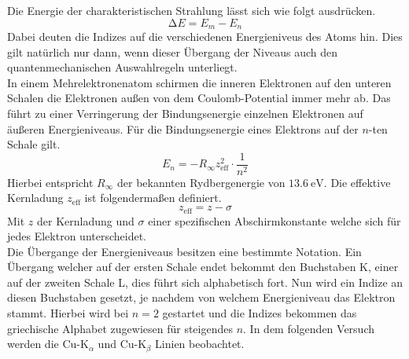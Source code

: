 Die Energie der charakteristischen Strahlung lässt sich wie folgt ausdrücken.
\begin{equation}
\increment E = E_{m} - E_{n}
\end{equation}
Dabei deuten die Indizes auf die verschiedenen Energieniveus des Atoms hin. Dies gilt natürlich nur dann, wenn dieser Übergang der Niveaus auch den quantenmechanischen Auswahlregeln unterliegt.
\\
In einem Mehrelektronenatom schirmen die inneren Elektronen auf den unteren Schalen die Elektronen außen von dem Coulomb-Potential immer mehr ab. Das führt zu einer Verringerung der Bindungsenergie einzelnen Elektronen
auf äußeren Energieniveaus. Für die Bindungsenergie eines Elektrons auf der $n$-ten Schale gilt.
\begin{equation}
E_{n} = -R_{\infty} z_{\text{eff}}^{2} \cdot \frac{1}{n^{2}}
\end{equation}
Hierbei entspricht $R_{\infty}$ der bekannten Rydbergenergie von $\SI{13.6}{\electronvolt}$. Die effektive Kernladung $ z_{\text{eff}}$ ist folgendermaßen definiert.
\begin{equation*}
 z_{\text{eff}} = z - \sigma
\end{equation*}
Mit $z$ der Kernladung und $\sigma$ einer spezifischen Abschirmkonstante welche sich für jedes Elektron unterscheidet.
\\
Die Übergange der Energieniveaus besitzen eine bestimmte Notation. Ein Übergang welcher auf der ersten Schale endet bekommt den Buchstaben K, einer auf der zweiten Schale L, dies führt sich
alphabetisch fort. Nun wird ein Indize an diesen Buchstaben gesetzt, je nachdem von welchem Energieniveau das Elektron stammt. Hierbei wird bei $n=2$ gestartet und die Indizes bekommen
das griechische Alphabet zugewiesen für steigendes $n$.
In dem folgenden Versuch werden die Cu-$\text{K}_{\alpha}$ und Cu-$\text{K}_{\beta}$ Linien beobachtet.

